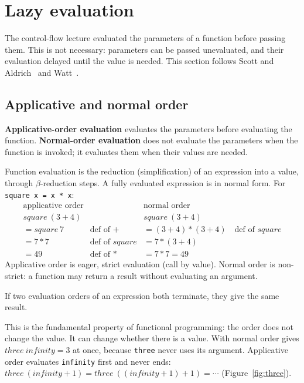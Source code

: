 \section{Lazy evaluation}
\label{sec:lazy}

The control-flow lecture evaluated the parameters of a function before
passing them. This is not necessary: parameters can be passed unevaluated, and
their evaluation delayed until the value is needed. This section follows
Scott and Aldrich~\cite{scott2025pragmatics} and
Watt~\cite{watt2004concepts}.

\subsection{Applicative and normal order}

\begin{definition}
\textbf{Applicative-order evaluation} evaluates the parameters before
evaluating the function. \textbf{Normal-order evaluation} does not evaluate the
parameters when the function is invoked; it evaluates them when their values
are needed.
\end{definition}

Function evaluation is the reduction (simplification) of an expression into
a value, through $\beta$-reduction steps. A fully evaluated expression is in
normal form. For \texttt{square x = x * x}:
\[
\begin{array}{lll}
\text{applicative order} & & \text{normal order} \\
\mathit{square}\ (3 + 4) & & \mathit{square}\ (3 + 4) \\
= \mathit{square}\ 7 & \text{def of } + & = (3 + 4) * (3 + 4) \quad \text{def of } \mathit{square} \\
= 7 * 7 & \text{def of } \mathit{square} & = 7 * (3 + 4) \\
= 49 & \text{def of } * & = 7 * 7 = 49
\end{array}
\]
Applicative order is eager, strict evaluation (call by value). Normal order is
non-strict: a function may return a result without evaluating an argument.

\begin{theorem}
If two evaluation orders of an expression both terminate, they give the same
result.
\end{theorem}

This is the fundamental property of functional programming: the order does
not change the value. It can change whether there is a value. With
normal order gives $\mathit{three}\ \mathit{infinity} = 3$ at once, because
\texttt{three} never uses its argument. Applicative order evaluates
\texttt{infinity} first and never ends:
$\mathit{three}\ (\mathit{infinity} + 1) = \mathit{three}\ ((\mathit{infinity} + 1) + 1) = \cdots$
(Figure~\ref{fig:three}).

